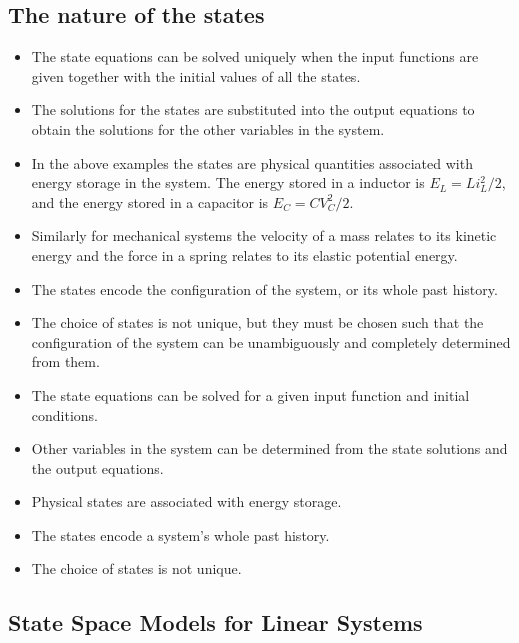 \subsection*{The nature of the states}

\begin{itemize}
	\item The state equations can be solved uniquely when the input functions are given together with the initial values of all the states.
	\item The solutions for the states are substituted into the output equations to obtain the solutions for the other variables in the system.
	\item In the above examples the states are physical quantities associated with energy storage in the system. The energy stored in a inductor is $E_L=Li_L^2/2$, and the energy stored in a capacitor is $E_C=CV_C^2/2$. 
	\item Similarly for mechanical systems the velocity of a mass relates to its kinetic energy and the force in a spring relates to its elastic potential energy.
	\item The states encode the configuration of the system, or its whole past history.
	\item The choice of states is not unique, but they must be chosen such that the configuration of the system can be unambiguously and completely determined from them.
\end{itemize}
\ifslidesonly
\begin{slide}
	\begin{itemize}
	\item The state equations can be solved for a given input function and initial conditions.
	\item Other variables in the system can be determined from the state solutions and the output equations.
	\item Physical states are associated with energy storage.
	\item The states encode a system's whole past history.
	\item The choice of states is not unique.
\end{itemize}
\end{slide}
\fi
 
\subsection*{State Space Models for Linear Systems}

